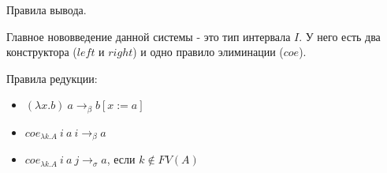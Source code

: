 \documentclass{amsart}
\theoremstyle{definition}
\theoremstyle{remark}
\numberwithin{figure}{section}
\begin{document}
\begin{table}
\begin{comment}
\medskip
\begin{center}
\AxiomC{$\Gamma, x : I \vdash A$}
\AxiomC{$\Gamma \vdash a : A[x := i]$}
\AxiomC{$\Gamma \vdash i : I$}
\AxiomC{$\Gamma \vdash j : I$}
\QuaternaryInfC{$\Gamma \vdash lift_{\lambda x. A}\ i\ a\ j : A[x := j]$}
\DisplayProof
\end{center}

\medskip
\begin{center}
\def\extraVskip{1pt}
\Axiom$\fCenter \Gamma \vdash i : I$
\noLine
\UnaryInf$\fCenter \Gamma \vdash j : I$
\Axiom$\fCenter \Gamma \vdash a : \Pi (y : I) A$
\noLine
\UnaryInf$\fCenter \Gamma \vdash a' : \Pi (y : I) A$
\noLine
\UnaryInf$\fCenter \Gamma \vdash f : I \to A[y := i]$
\def\extraVskip{2pt}
\RightLabel{, $a\ i =_\beta f\ left$, $f\ right =_\beta a'\ i$}
\BinaryInfC{$\Gamma \vdash fill_{\lambda y. A}\ a\ a'\ i\ f\ j : I \to A[y := j]$}
\DisplayProof
\end{center}
\end{comment}

\bigskip
\caption{Правила вывода.}
\label{table:inf-rules}
\end{table}

Главное нововведение данной системы - это тип интервала $I$.
У него есть два конструктора ($left$ и $right$) и одно правило элиминации ($coe$).

Правила редукции:
\begin{itemize}
\item $(\lambda x.b)\ a \to_\beta b[x := a]$
\item $coe_{\lambda k.A}\ i\ a\ i \to_\beta a$
\item $coe_{\lambda k.A}\ i\ a\ j \to_\sigma a$, если $k \notin FV(A)$
\end{itemize}

\end{document}
